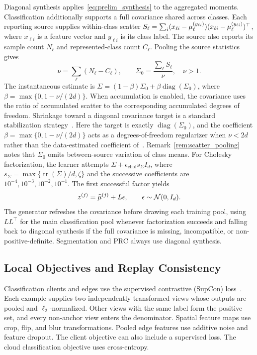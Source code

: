 Diagonal synthesis applies~\eqref{eq:prelim_synthesis} to the aggregated moments. Classification additionally supports a full covariance shared across classes. Each reporting source supplies within-class scatter
$S_\ell=\sum_i(x_{\ell i}-\mu_\ell^{(y_{\ell i})})(x_{\ell i}-\mu_\ell^{(y_{\ell i})})^\top$,
where $x_{\ell i}$ is a feature vector and $y_{\ell i}$ is its class label. The source also reports its sample count $N_\ell$ and represented-class count $C_\ell$. Pooling the source statistics gives
\begin{equation}
 \nu=\sum_\ell(N_\ell-C_\ell),\qquad
 \Sigma_0=\frac{\sum_\ell S_\ell}{\nu},\quad \nu>1.
 \label{eq:pooled_covariance}
\end{equation}
The instantaneous estimate is
$\Sigma=(1-\beta)\Sigma_0+\beta\operatorname{diag}(\Sigma_0)$,
where $\beta=\max\{0,1-\nu/(2d)\}$.
When accumulation is enabled, the covariance uses the ratio of accumulated scatter to the corresponding accumulated degrees of freedom.
Shrinkage toward a diagonal covariance target is a standard stabilization strategy~\cite{schafer2005shrinkage}. Here the target is exactly $\operatorname{diag}(\Sigma_0)$, and the coefficient $\beta=\max\{0,1-\nu/(2d)\}$ acts as a degrees-of-freedom regularizer when $\nu<2d$ rather than the data-estimated coefficient of~\cite{schafer2005shrinkage}. Remark~\ref{rem:scatter_pooling} notes that $\Sigma_0$ omits between-source variation of class means.
For Cholesky factorization, the learner attempts
$\Sigma+\epsilon_{\mathrm{chol}}s_\Sigma I_d$,
where $s_\Sigma=\max\{\operatorname{tr}(\Sigma)/d,\zeta\}$ and the successive coefficients are $10^{-4},10^{-3},10^{-2},10^{-1}$. The first successful factor yields
\begin{equation}
 z^{(j)}=\widehat{\mu}^{(j)}+L\epsilon,\qquad \epsilon\sim\mathcal N(0,I_d).
 \label{eq:lowrank_synthesis}
\end{equation}
The generator refreshes the covariance before drawing each training pool, using $LL^\top$ for the main classification pool whenever factorization succeeds and falling back to diagonal synthesis if the full covariance is missing, incompatible, or non-positive-definite. Segmentation and PRC always use diagonal synthesis.

\subsection{Local Objectives and Replay Consistency}
\label{sec:regularization}
\label{sec:prc}

Classification clients and edges use the supervised contrastive (SupCon) loss~\cite{khosla2020supervised}. Each example supplies two independently transformed views whose outputs are pooled and $\ell_2$-normalized. Other views with the same label form the positive set, and every non-anchor view enters the denominator. Spatial feature maps use crop, flip, and blur transformations. Pooled edge features use additive noise and feature dropout. The client objective can also include a supervised loss. The cloud classification objective uses cross-entropy.

